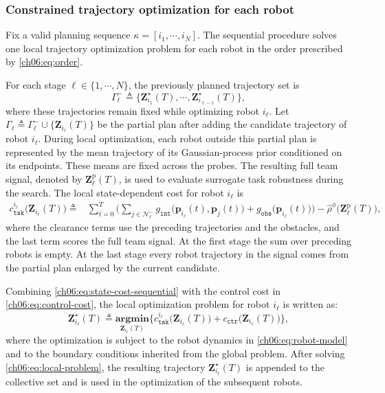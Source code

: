 \subsubsection{Constrained trajectory optimization for each robot}
\label{ch06:subsec:sequential-planning}

Fix a valid planning sequence
$\kappa=[i_1,\cdots,i_N]$.
The sequential procedure solves one local trajectory optimization problem
for each robot in the order prescribed by \eqref{ch06:eq:order}.
\begin{revision}
For each stage $\ell\in\{1,\cdots,N\}$, the previously planned trajectory set is
\[
\Gamma_\ell^-\triangleq
\{\mathbf{Z}_{i_1}^\star(T),\cdots,
\mathbf{Z}_{i_{\ell-1}}^\star(T)\},
\]
where these trajectories remain fixed while optimizing robot $i_\ell$. Let
$\Gamma_\ell\triangleq
\Gamma_\ell^-\cup\{\mathbf{Z}_{i_\ell}(T)\}$
be the partial plan after adding the candidate trajectory of robot $i_\ell$.
During local optimization, each robot outside this partial plan is
represented by the mean trajectory of its Gaussian-process prior
conditioned on its endpoints. These means are fixed across the probes.
The resulting full team signal, denoted by $\mathbf{Z}^{\mathrm{p}}_\ell(T)$,
is used to evaluate surrogate task robustness during the search. The local
state-dependent cost for robot $i_\ell$ is
\begin{equation}
\label{ch06:eq:state-cost-sequential}
\begin{aligned}
c_{\texttt{tsk}}^{i_\ell}\big(\mathbf{Z}_{i_\ell}(T)\big)
\triangleq
&\sum_{t=0}^{T}
\Bigg(
\sum_{j\in\mathcal{N}_\ell^-}
g_{\texttt{int}}
\big(\mathbf{p}_{i_\ell}(t),\mathbf{p}_{j}(t)\big)
+ g_{\texttt{obs}}\big(\mathbf{p}_{i_\ell}(t)\big)
\Bigg)-\widehat{\rho}^{\phi}\big(\mathbf{Z}^{\mathrm{p}}_\ell(T)\big),
\end{aligned}
\end{equation}
where the clearance terms use the preceding trajectories and the obstacles,
and the last term scores the full team signal. At the first stage the sum
over preceding robots is empty. At the last stage every robot trajectory
in the signal comes from the partial plan enlarged by the current candidate.
\end{revision}
Combining \eqref{ch06:eq:state-cost-sequential} with the control cost in
\eqref{ch06:eq:control-cost}, the local optimization problem for robot
$i_\ell$ is written as:
\begin{equation}
\label{ch06:eq:local-problem}
\mathbf{Z}_{i_\ell}^\star(T)\triangleq
\underset{\mathbf{Z}_{i_\ell}(T)}{\textbf{argmin}}
\Big\{
c_{\texttt{tsk}}^{i_\ell}\big(\mathbf{Z}_{i_\ell}(T)\big)
+
c_{\texttt{ctr}}\big(\mathbf{Z}_{i_\ell}(T)\big)
\Big\},
\end{equation}
where the optimization is subject to the robot dynamics in
\eqref{ch06:eq:robot-model} and to the boundary conditions inherited from the
global problem.
After solving \eqref{ch06:eq:local-problem}, the resulting trajectory
$\mathbf{Z}_{i_\ell}^\star(T)$ is appended to the collective set and is
used in the optimization of the subsequent robots.

